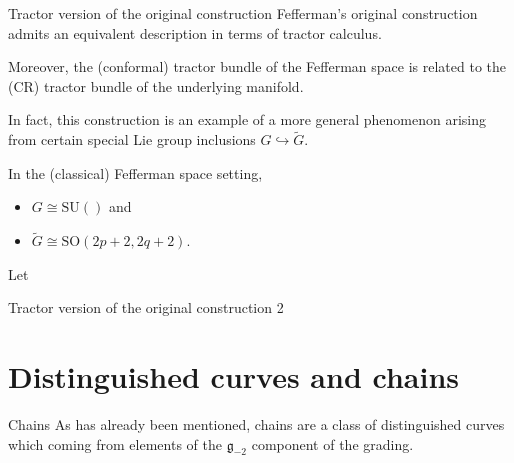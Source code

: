 \documentclass[handout]{beamer}
\begin{document}
\begin{frame}{Tractor version of the original construction}
  Fefferman's original construction admits an equivalent description in terms of
  tractor calculus.

  Moreover, the (conformal) tractor bundle of the Fefferman space is related to
  the (CR) tractor bundle of the underlying manifold.

  In fact, this construction is an example of a more general phenomenon arising
  from certain special Lie group inclusions $G \hookrightarrow \tilde{G}$.

  In the (classical) Fefferman space setting, 
  \begin{itemize}
    \item $G \cong \mathrm{SU}()$ and 
    \item $\tilde{G} \cong \mathrm{SO}(2p+2, 2q+2)$.
  \end{itemize}

  \begin{theorem}
    Let
  \end{theorem}
\end{frame}

\begin{frame}{Tractor version of the original construction 2}
\end{frame}
\section{Distinguished curves and chains}

\begin{frame}{Chains}
  As has already been mentioned, chains are a class of distinguished curves
  which coming from elements of the $\mathfrak{g}_{-2}$ component of the
  grading.
\end{frame}
\end{document}
